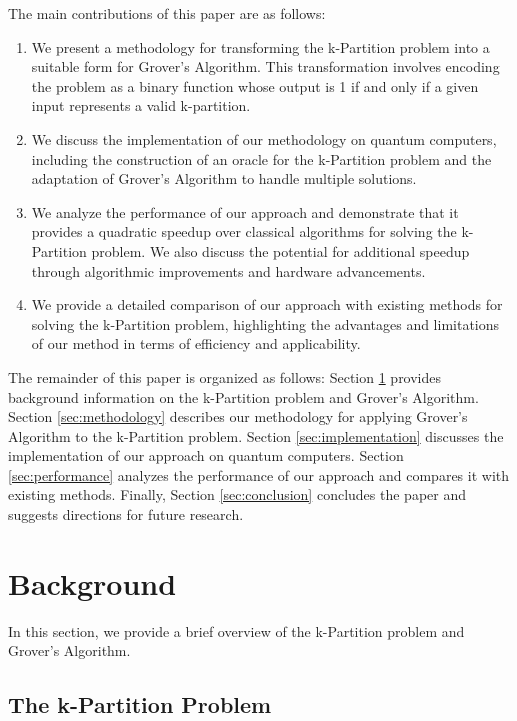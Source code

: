 The main contributions of this paper are as follows:

\begin{enumerate}
    \item We present a methodology for transforming the k-Partition problem into a suitable form for Grover's Algorithm. This transformation involves encoding the problem as a binary function whose output is 1 if and only if a given input represents a valid k-partition.

    \item We discuss the implementation of our methodology on quantum computers, including the construction of an oracle for the k-Partition problem and the adaptation of Grover's Algorithm to handle multiple solutions.

    \item We analyze the performance of our approach and demonstrate that it provides a quadratic speedup over classical algorithms for solving the k-Partition problem. We also discuss the potential for additional speedup through algorithmic improvements and hardware advancements.

    \item We provide a detailed comparison of our approach with existing methods for solving the k-Partition problem, highlighting the advantages and limitations of our method in terms of efficiency and applicability.

\end{enumerate}

The remainder of this paper is organized as follows: Section \ref{sec:background} provides background information on the k-Partition problem and Grover's Algorithm. Section \ref{sec:methodology} describes our methodology for applying Grover's Algorithm to the k-Partition problem. Section \ref{sec:implementation} discusses the implementation of our approach on quantum computers. Section \ref{sec:performance} analyzes the performance of our approach and compares it with existing methods. Finally, Section \ref{sec:conclusion} concludes the paper and suggests directions for future research.

\section{Background}\label{sec:background}

In this section, we provide a brief overview of the k-Partition problem and Grover's Algorithm.

\subsection{The k-Partition Problem}

